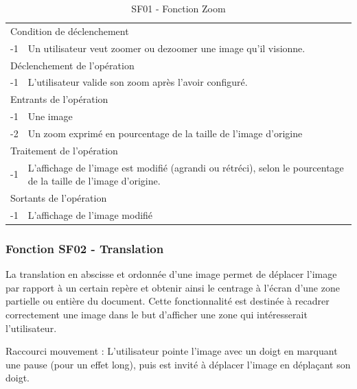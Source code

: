 \documentclass[a4paper]{article}
\begin{document}
\begin{table}[H]
  \centering
   \small
	\begin{tabular}{|c|p{12cm}|}
   		\hline
   			\rowcolor{lightgray}\multicolumn{2}{|c|}{\textbf{SF01 - Fonction Zoom}} \\
   		\hline
   			\multicolumn{2}{|l|}{Condition de d\'eclenchement} \\
   		\hline
   			-1 & Un utilisateur veut zoomer ou dezoomer une image qu'il visionne. \\
   		\hline
   			\multicolumn{2}{|l|}{D\'eclenchement de l'op\'eration} \\
   		\hline
   			-1 & L'utilisateur valide son zoom après l'avoir configuré. \\
   		\hline
   			\multicolumn{2}{|l|}{Entrants de l'op\'eration} \\
   		\hline
   			-1 & Une image \\
        	-2 & Un zoom exprimé en pourcentage de la taille de l'image d'origine \\ 	
        \hline
   			\multicolumn{2}{|l|}{Traitement de l'op\'eration} \\
  		\hline
   			-1 & L'affichage de l'image est modifié (agrandi ou rétréci), selon le pourcentage de la taille de l'image d'origine. \\
   		\hline
   			\multicolumn{2}{|l|}{Sortants de l'op\'eration} \\
   		\hline
   			-1 & L'affichage de l'image modifié \\
   		\hline
	\end{tabular}
  \caption{SF01 - Fonction Zoom}
  \normalsize
  \label{tab:visu_img_zoom}
\end{table}


\subsubsection{Fonction SF02 - Translation}

La translation en abscisse et ordonnée d'une image permet de déplacer l'image par rapport à un certain repère et obtenir ainsi le centrage à l'écran d'une zone partielle ou entière du document. Cette fonctionnalité est destinée à recadrer correctement une image dans le but d'afficher une zone qui intéresserait l'utilisateur.

Raccourci mouvement : L'utilisateur pointe l'image avec un doigt en marquant une pause (pour un effet long), puis est invité à déplacer l'image en déplaçant son doigt.
\end{document}
